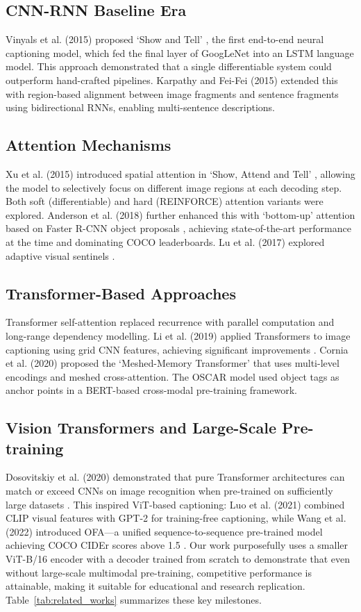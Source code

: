 \documentclass[conference]{IEEEtran}
\begin{document}
\subsection{CNN-RNN Baseline Era}
Vinyals et al. (2015) proposed `Show and Tell' \cite{vinyals2015show}, the first end-to-end neural captioning model, which fed the final layer of GoogLeNet into an LSTM language model. This approach demonstrated that a single differentiable system could outperform hand-crafted pipelines. Karpathy and Fei-Fei (2015) extended this with region-based alignment between image fragments and sentence fragments using bidirectional RNNs, enabling multi-sentence descriptions.

\subsection{Attention Mechanisms}
Xu et al. (2015) introduced spatial attention in `Show, Attend and Tell' \cite{xu2015show}, allowing the model to selectively focus on different image regions at each decoding step. Both soft (differentiable) and hard (REINFORCE) attention variants were explored. Anderson et al. (2018) further enhanced this with `bottom-up' attention based on Faster R-CNN object proposals \cite{anderson2018bottom}, achieving state-of-the-art performance at the time and dominating COCO leaderboards. Lu et al. (2017) explored adaptive visual sentinels \cite{lu2017knowing}.

\subsection{Transformer-Based Approaches}
Transformer self-attention \cite{vaswani2017attention} replaced recurrence with parallel computation and long-range dependency modelling. Li et al. (2019) applied Transformers to image captioning using grid CNN features, achieving significant improvements \cite{li2019visualbert}. Cornia et al. (2020) proposed the `Meshed-Memory Transformer' \cite{cornia2020meshed} that uses multi-level encodings and meshed cross-attention. The OSCAR model \cite{li2020oscar} used object tags as anchor points in a BERT-based cross-modal pre-training framework.

\subsection{Vision Transformers and Large-Scale Pre-training}
Dosovitskiy et al. (2020) demonstrated that pure Transformer architectures can match or exceed CNNs on image recognition when pre-trained on sufficiently large datasets \cite{dosovitskiy2020image}. This inspired ViT-based captioning: Luo et al. (2021) combined CLIP visual features with GPT-2 for training-free captioning, while Wang et al. (2022) introduced OFA---a unified sequence-to-sequence pre-trained model achieving COCO CIDEr scores above 1.5 \cite{wang2022ofa}. Our work purposefully uses a smaller ViT-B/16 encoder with a decoder trained from scratch to demonstrate that even without large-scale multimodal pre-training, competitive performance is attainable, making it suitable for educational and research replication. Table~\ref{tab:related_works} summarizes these key milestones.
\end{document}
